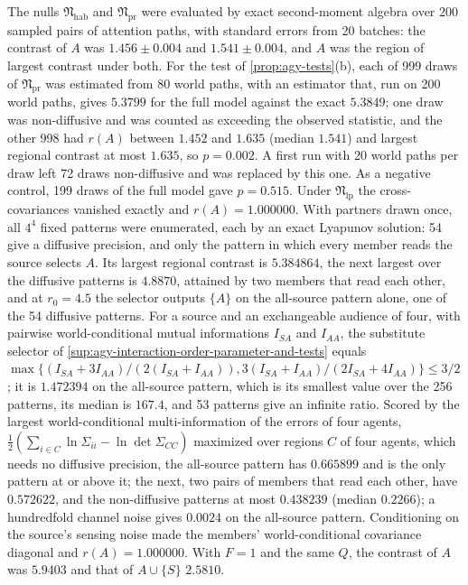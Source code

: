 \begin{numcheck}
The nulls $\mathfrak N_{\mathrm{hab}}$ and $\mathfrak N_{\mathrm{pr}}$ were evaluated by exact second-moment algebra over 200 sampled pairs of attention paths, with standard errors from 20 batches: the contrast of $A$ was $1.456\pm0.004$ and $1.541\pm0.004$, and $A$ was the region of largest contrast under both. For the test of \cref{prop:agy-tests}(b), each of 999 draws of $\mathfrak N_{\mathrm{pr}}$ was estimated from 80 world paths, with an estimator that, run on 200 world paths, gives $5.3799$ for the full model against the exact $5.3849$; one draw was non-diffusive and was counted as exceeding the observed statistic, and the other 998 had $r(A)$ between $1.452$ and $1.635$ (median $1.541$) and largest regional contrast at most $1.635$, so $p=0.002$. A first run with 20 world paths per draw left 72 draws non-diffusive and was replaced by this one. As a negative control, 199 draws of the full model gave $p=0.515$. Under $\mathfrak N_{\mathrm{lp}}$ the cross-covariances vanished exactly and $r(A)=1.000000$. With partners drawn once, all $4^4$ fixed patterns were enumerated, each by an exact Lyapunov solution: 54 give a diffusive precision, and only the pattern in which every member reads the source selects $A$. Its largest regional contrast is $5.384864$, the next largest over the diffusive patterns is $4.8870$, attained by two members that read each other, and at $r_0=4.5$ the selector outputs $\{A\}$ on the all-source pattern alone, one of the 54 diffusive patterns. For a source and an exchangeable audience of four, with pairwise world-conditional mutual informations $I_{SA}$ and $I_{AA}$, the substitute selector of \cref{sup:agy-interaction-order-parameter-and-tests} equals $\max\{(I_{SA}+3I_{AA})/(2(I_{SA}+I_{AA})),3(I_{SA}+I_{AA})/(2I_{SA}+4I_{AA})\}\le3/2$; it is $1.472394$ on the all-source pattern, which is its smallest value over the 256 patterns, its median is $167.4$, and 53 patterns give an infinite ratio. Scored by the largest world-conditional multi-information of the errors of four agents, $\frac12(\sum_{i\in C}\ln\Sigma_{ii}-\ln\det\Sigma_{CC})$ maximized over regions $C$ of four agents, which needs no diffusive precision, the all-source pattern has $0.665899$ and is the only pattern at or above it; the next, two pairs of members that read each other, have $0.572622$, and the non-diffusive patterns at most $0.438239$ (median $0.2266$); a hundredfold channel noise gives $0.0024$ on the all-source pattern. Conditioning on the source's sensing noise made the members' world-conditional covariance diagonal and $r(A)=1.000000$. With $F=1$ and the same $Q$, the contrast of $A$ was $5.9403$ and that of $A\cup\{S\}$ $2.5810$.


\end{numcheck}
